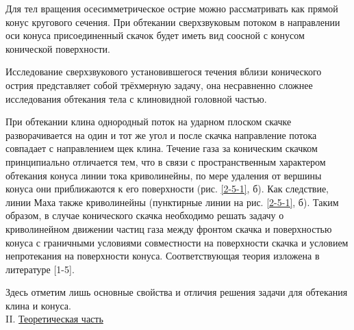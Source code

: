 \documentclass[specialist, subf, href, colorlinks=true, 14pt, final]{disser}
\theoremstyle{definition}
\newcommand{\npart}[2]{\noindent #1. \underline{#2}}
\begin{document}
Для тел вращения осесимметрическое острие можно рассматривать как прямой конус кругового сечения. При обтекании сверхзвуковым потоком в направлении оси конуса присоединенный скачок будет иметь вид соосной с конусом конической поверхности.

Исследование сверхзвукового установившегося течения вблизи конического острия представляет собой трёхмерную задачу, она несравненно сложнее исследования обтекания тела с клиновидной головной частью.

При обтекании клина однородный поток на ударном плоском скачке разворачивается на один и тот же угол и после скачка направление потока совпадает с направлением щек клина. Течение газа за коническим скачком принципиально отличается тем, что в связи с пространственным характером обтекания конуса линии тока криволинейны, по мере удаления от вершины конуса они приближаются к его поверхности (рис. \ref{2-5-1}, б). Как следствие, линии Маха также криволинейны (пунктирные линии на рис. \ref{2-5-1}, б). Таким образом, в случае конического скачка необходимо решать задачу о криволинейном движении частиц газа между фронтом скачка и поверхностью конуса с граничными условиями совместности на поверхности скачка и условием непротекания на поверхности конуса. Соответствующая теория изложена в литературе [1-5].

Здесь отметим лишь основные свойства и отличия решения задачи для обтекания клина и конуса.\\

\npart{II}{Теоретическая часть}
\end{document}

